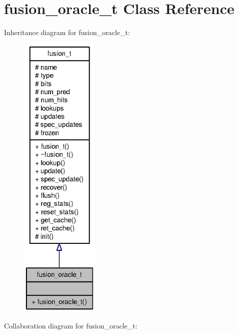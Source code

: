 \section{fusion\_\-oracle\_\-t Class Reference}
\label{classfusion__oracle__t}
Inheritance diagram for fusion\_\-oracle\_\-t:\nopagebreak
\begin{figure}[H]
\begin{center}
\leavevmode
\includegraphics[height=400pt]{classfusion__oracle__t__inherit__graph}
\end{center}
\end{figure}
Collaboration diagram for fusion\_\-oracle\_\-t:\nopagebreak
